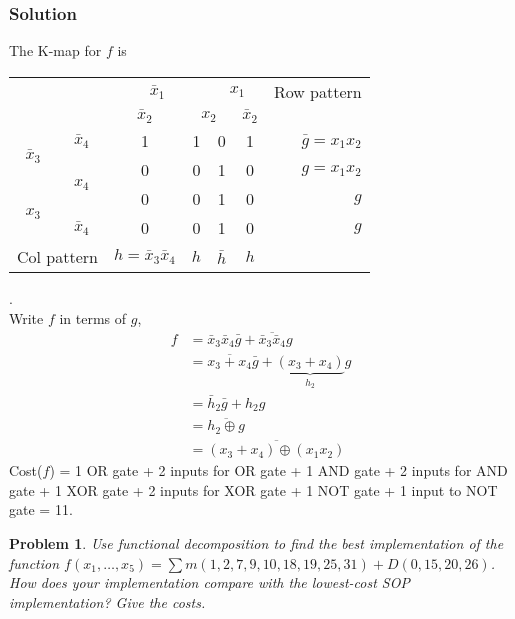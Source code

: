 \documentclass[twocolumn]{article}
\newtheorem{prob}{Problem}
\newcommand{\bx}{\bar{x}}
\begin{document}
\subsubsection*{Solution}
The K-map for $f$ is
\\[1em]
\begin{tabular}{cc|cccc|r}
  \toprule
  && \multicolumn{2}{c|}{$\bx_1$} & \multicolumn{2}{c|}{$x_1$} & Row pattern
  \\
  && $\bx_2$ & \multicolumn{2}{|c|}{$x_2$} & $\bx_2$
  \\ \midrule
  \multirow{2}{*}{$\bx_3$} & $\bx_4$
                                  & 1 & 1 & 0 & 1 & $\bar{g} = x_1 x_2$
  \\\cmidrule{2-2}
  & \multirow{2}{*}{$x_4$}
                                  & 0 & 0 & 1 & 0 & $g = x_1x_2$
  \\\cmidrule{1-1}
  \multirow{2}{*}{$x_3$}   &
                                  & 0 & 0 & 1 & 0 & $g$
  \\\cmidrule{2-2}
  & $\bx_4$
                                  & 0 & 0 & 1 & 0 & $g$
  \\\midrule
  \multicolumn{2}{l|}{Col pattern} & $h = \bx_3\bx_4$ & $h$ &  $\bar{h}$ & $h$ & 
  \\\bottomrule
\end{tabular}.
\\[1em]

Write $f$ in terms of $g$,
\begin{align}
  f &= \bx_3\bx_4 \bar{g} +  \overline{\bx_3\bx_4} g
  \\
  &= \overline{x_3 + x_4} \bar{g} + \underbrace{(x_3 + x_4)}_{h_2} g
  \\
  &= \bar{h}_2 \bar{g} + h_2 g
    \\
  &= \overline{h_2 \oplus g}
    \\
  &= \overline{(x_3 + x_4) \oplus (x_1 x_2)}
\end{align}
Cost($f$) = 1 OR gate + 2 inputs for OR gate + 1 AND gate + 2 inputs for AND
gate + 1 XOR gate + 2 inputs for XOR gate + 1 NOT gate + 1 input to NOT gate = 11.

\begin{prob}
  Use functional
  decomposition to find the best implementation of the function $f (x_1 , \dots,
  x_5 ) = \sum m(1, 2, 7, 9, 10, 18, 19, 25, 31) + D(0, 15, 20, 26)$. How does your implementation compare with the lowest-cost SOP implementation? Give the costs.
  \label{prob:4}
\end{prob}
\end{document}
